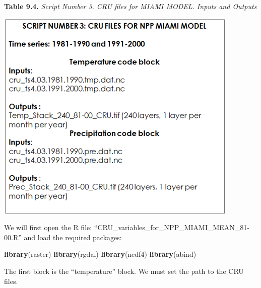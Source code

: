 \documentclass[
  10pt,
  b5paper,
]{book}
\newenvironment{Shaded}{\begin{snugshade}}{\end{snugshade}}
\newcommand{\KeywordTok}[1]{\textcolor[rgb]{0.13,0.29,0.53}{\textbf{#1}}}
\newcommand{\NormalTok}[1]{#1}
\begin{document}
\textbf{Table 9.4.} \emph{Script Number 3. CRU files for MIAMI MODEL. Inputs and Outputs}

\includegraphics{tables/Table_9.3.png}

We will first open the R file: ``CRU\_variables\_for\_NPP\_MIAMI\_MEAN\_81-00.R'' and load the required packages:

\begin{Shaded}
\begin{Highlighting}[]
\KeywordTok{library}\NormalTok{(raster)}
\KeywordTok{library}\NormalTok{(rgdal)}
\KeywordTok{library}\NormalTok{(ncdf4)}
\KeywordTok{library}\NormalTok{(abind)}
\end{Highlighting}
\end{Shaded}

The first block is the ``temperature'' block. We must set the path to the CRU files.
\end{document}
